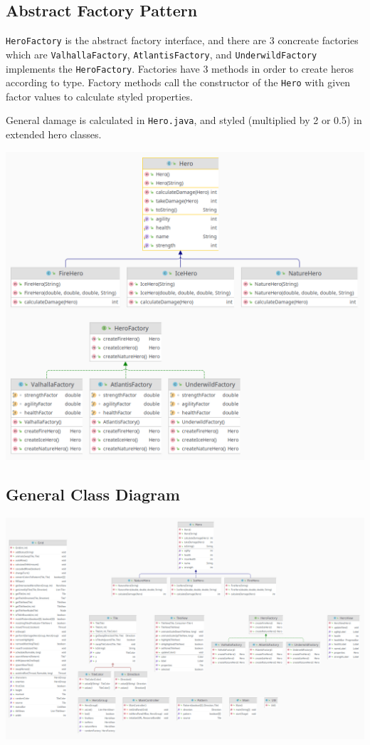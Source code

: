 \documentclass[a4paper]{article}
\begin{document}
\newpage
\subsection*{Abstract Factory Pattern}
\label{sec:orge6c3308}

\texttt{HeroFactory} is the abstract factory interface, and there are 3 concreate factories which are \texttt{ValhallaFactory}, \texttt{AtlantisFactory}, and \texttt{UnderwildFactory} implements the \texttt{HeroFactory}.
Factories have 3 methods in order to create heros according to type.
Factory methods call the constructor of the \texttt{Hero} with given factor values to calculate styled properties.

General damage is calculated in \texttt{Hero.java}, and styled (multiplied by 2 or 0.5) in extended hero classes.



\begin{center}
\includegraphics[width=.9\linewidth]{org-img/Design_Explanation/2021-11-09_15-45-09_screenshot.png}
\end{center}


\newpage
\subsection*{General Class Diagram}
\label{sec:org899f246}


\begin{center}
\includegraphics[width=.9\linewidth]{org-img/Design_Explanation/2021-11-10_01-49-35_screenshot.png}
\end{center}
\end{document}

